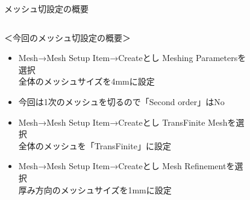 \begin{frame}{メッシュ切設定の概要}
   \begin{columns}[t]
    \begin{column}{0.6\textwidth}
      ＜今回のメッシュ切設定の概要＞
      \begin{itemize}
        \item[(1)]<1-> Mesh→Mesh Setup Item→Createとし
                       Meshing Parametersを選択 \\
                       全体のメッシュサイズを4mmに設定
	\item[(2)]<2-> 今回は1次のメッシュを切るので「Second order」はNo
        \item[(3)]<3-> Mesh→Mesh Setup Item→Createとし
                       TransFinite Meshを選択 \\
		       全体のメッシュを「TransFinite」に設定
        \item[(4)]<4-> Mesh→Mesh Setup Item→Createとし
                       Mesh Refinementを選択 \\
	               厚み方向のメッシュサイズを1mmに設定
      \end{itemize}
    \end{column}
    \begin{column}{0.4\textwidth}
      \vspace{-7mm}
      \begin{figure}[htbp]
        \begin{center}
          \begin{overlayarea}{7cm}{15cm}

\end{overlayarea}
\end{center}
\end{figure}
\end{column}
\end{columns}
\end{frame}
